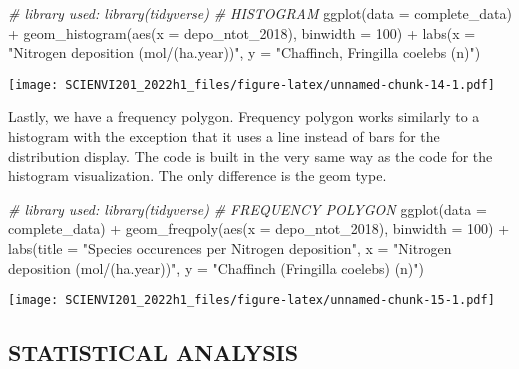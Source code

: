 \documentclass[
]{article}
\newenvironment{Shaded}{\begin{snugshade}}{\end{snugshade}}
\newcommand{\AttributeTok}[1]{\textcolor[rgb]{0.77,0.63,0.00}{#1}}
\newcommand{\CommentTok}[1]{\textcolor[rgb]{0.56,0.35,0.01}{\textit{#1}}}
\newcommand{\DecValTok}[1]{\textcolor[rgb]{0.00,0.00,0.81}{#1}}
\newcommand{\FunctionTok}[1]{\textcolor[rgb]{0.00,0.00,0.00}{#1}}
\newcommand{\NormalTok}[1]{#1}
\newcommand{\SpecialCharTok}[1]{\textcolor[rgb]{0.00,0.00,0.00}{#1}}
\newcommand{\StringTok}[1]{\textcolor[rgb]{0.31,0.60,0.02}{#1}}
\begin{document}
\begin{Shaded}
\begin{Highlighting}[]
\CommentTok{\# library used: library(tidyverse)}
\CommentTok{\# HISTOGRAM}
\FunctionTok{ggplot}\NormalTok{(}\AttributeTok{data =}\NormalTok{ complete\_data) }\SpecialCharTok{+}
  \FunctionTok{geom\_histogram}\NormalTok{(}\FunctionTok{aes}\NormalTok{(}\AttributeTok{x =}\NormalTok{ depo\_ntot\_2018), }\AttributeTok{binwidth =} \DecValTok{100}\NormalTok{) }\SpecialCharTok{+}
  \FunctionTok{labs}\NormalTok{(}\AttributeTok{x =} \StringTok{"Nitrogen deposition (mol/(ha.year))"}\NormalTok{,}
      \AttributeTok{y =} \StringTok{"Chaffinch, Fringilla coelebs (n)"}\NormalTok{)}
\end{Highlighting}
\end{Shaded}

\texttt{[image: SCIENVI201\_2022h1\_files/figure-latex/unnamed-chunk-14-1.pdf]}

Lastly, we have a frequency polygon. Frequency polygon works similarly
to a histogram with the exception that it uses a line instead of bars
for the distribution display. The code is built in the very same way as
the code for the histogram visualization. The only difference is the
geom type.

\begin{Shaded}
\begin{Highlighting}[]
\CommentTok{\# library  used: library(tidyverse)}
\CommentTok{\# FREQUENCY POLYGON}
\FunctionTok{ggplot}\NormalTok{(}\AttributeTok{data =}\NormalTok{ complete\_data) }\SpecialCharTok{+}
  \FunctionTok{geom\_freqpoly}\NormalTok{(}\FunctionTok{aes}\NormalTok{(}\AttributeTok{x =}\NormalTok{ depo\_ntot\_2018), }\AttributeTok{binwidth =} \DecValTok{100}\NormalTok{) }\SpecialCharTok{+}
  \FunctionTok{labs}\NormalTok{(}\AttributeTok{title =} \StringTok{"Species occurences per Nitrogen deposition"}\NormalTok{,}
       \AttributeTok{x =} \StringTok{"Nitrogen deposition (mol/(ha.year))"}\NormalTok{,}
       \AttributeTok{y =} \StringTok{"Chaffinch (Fringilla coelebs) (n)"}\NormalTok{)}
\end{Highlighting}
\end{Shaded}

\texttt{[image: SCIENVI201\_2022h1\_files/figure-latex/unnamed-chunk-15-1.pdf]}

\hypertarget{statistical-analysis}{%
\subsection{STATISTICAL ANALYSIS}\label{statistical-analysis}}
\end{document}
